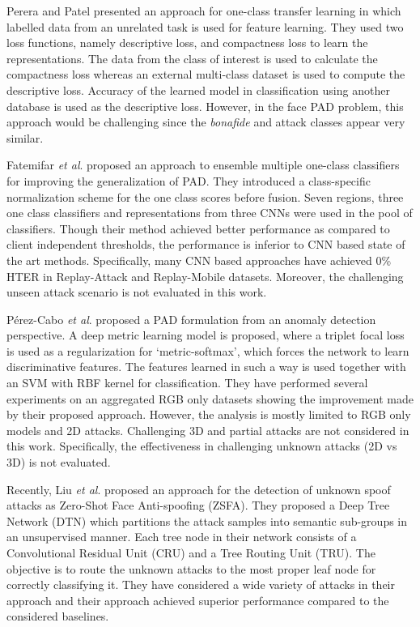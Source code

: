 \documentclass[journal]{IEEEtran}
\begin{document}
Perera and Patel \cite{perera2019learning} presented an approach for one-class transfer learning in which labelled data from an unrelated task is used for feature learning. They used two loss functions, namely
descriptive loss, and compactness loss to learn the representations. The data from the class of interest is used to calculate the compactness loss whereas an external multi-class dataset is used to compute the descriptive loss. Accuracy of the learned model in classification using another database is used as the descriptive loss. However, in the face PAD
problem, this approach would be challenging since the \textit{bonafide} and attack classes appear very similar.

Fatemifar \textit{et al}. \cite{fatemifar2019combining} proposed an approach to ensemble multiple one-class classifiers for improving the generalization of PAD. They introduced a class-specific normalization scheme for the one class scores before fusion. Seven regions, three one class classifiers and representations from three CNNs were used in the pool of classifiers. Though their method achieved better performance as compared to client independent thresholds, the performance is inferior to CNN based state of the art methods. Specifically, many CNN based approaches have achieved 0\% HTER in Replay-Attack and Replay-Mobile datasets. Moreover, the challenging unseen attack scenario is not evaluated in this work.

P{\'e}rez-Cabo \textit{et al}. \cite{perez2019deep} proposed a PAD formulation from an anomaly detection perspective.
A deep metric learning model is proposed, where a triplet focal loss is used as a regularization for `metric-softmax', which forces the network to learn discriminative features. The features learned in such a way is used together with an SVM with RBF kernel for classification. They have performed several experiments on an aggregated RGB only datasets showing the improvement made by their proposed approach. However, the analysis is mostly limited to RGB only models and 2D attacks. Challenging 3D and partial attacks are not considered in this work. Specifically, the effectiveness in challenging unknown attacks (2D vs 3D) is not evaluated.

Recently, Liu \textit{et al}. \cite{Liu_2019_CVPR} proposed an approach for
the detection of unknown spoof attacks as Zero-Shot Face Anti-spoofing (ZSFA).  They proposed a Deep Tree Network (DTN) which partitions the attack samples into semantic sub-groups in an unsupervised manner. Each tree node in their network consists of a Convolutional Residual Unit (CRU) and a Tree Routing Unit (TRU).  The objective is to route the unknown attacks to the most proper leaf node for correctly classifying it. They have considered a wide variety of attacks in their approach and their approach achieved superior performance compared to the considered baselines.
\end{document}
